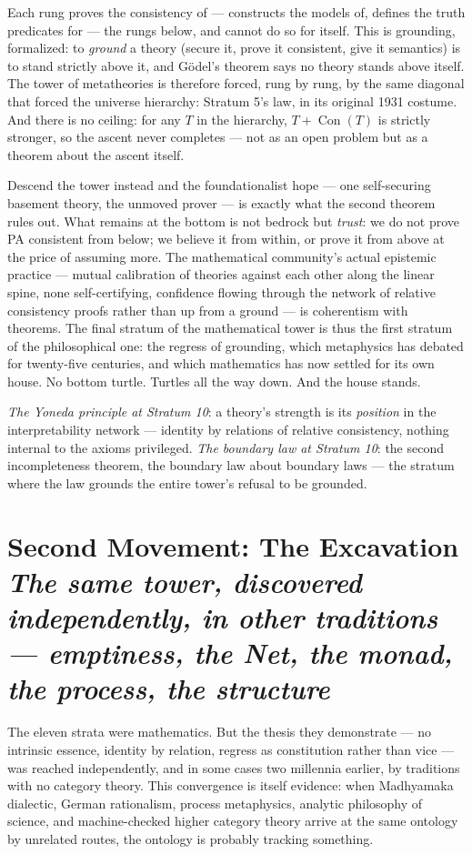 \documentclass[11pt]{article}
\theoremstyle{plain}
\theoremstyle{definition}
\theoremstyle{remark}
\newcommand{\Con}{\operatorname{Con}}
\newcommand{\stratum}[2]{\section{#1 \\ {\normalsize\normalfont\itshape #2}}}
\begin{document}
Each rung proves the consistency of --- constructs the models of, defines the truth predicates for --- the rungs below, and cannot do so for itself. This is grounding, formalized: to \emph{ground} a theory (secure it, prove it consistent, give it semantics) is to stand strictly above it, and G\"odel's theorem says no theory stands above itself. The tower of metatheories is therefore forced, rung by rung, by the same diagonal that forced the universe hierarchy: Stratum 5's law, in its original 1931 costume. And there is no ceiling: for any $T$ in the hierarchy, $T + \Con(T)$ is strictly stronger, so the ascent never completes --- not as an open problem but as a theorem about the ascent itself.

Descend the tower instead and the foundationalist hope --- one self-securing basement theory, the unmoved prover --- is exactly what the second theorem rules out. What remains at the bottom is not bedrock but \emph{trust}: we do not prove PA consistent from below; we believe it from within, or prove it from above at the price of assuming more. The mathematical community's actual epistemic practice --- mutual calibration of theories against each other along the linear spine, none self-certifying, confidence flowing through the network of relative consistency proofs rather than up from a ground --- is coherentism with theorems. The final stratum of the mathematical tower is thus the first stratum of the philosophical one: the regress of grounding, which metaphysics has debated for twenty-five centuries, and which mathematics has now settled for its own house. No bottom turtle. Turtles all the way down. And the house stands.

\begin{refrain}
\emph{The Yoneda principle at Stratum 10}: a theory's strength is its \emph{position} in the interpretability network --- identity by relations of relative consistency, nothing internal to the axioms privileged. \emph{The boundary law at Stratum 10}: the second incompleteness theorem, the boundary law about boundary laws --- the stratum where the law grounds the entire tower's refusal to be grounded.
\end{refrain}

\stratum{Second Movement: The Excavation}{The same tower, discovered independently, in other traditions --- emptiness, the Net, the monad, the process, the structure}

The eleven strata were mathematics. But the thesis they demonstrate --- no intrinsic essence, identity by relation, regress as constitution rather than vice --- was reached independently, and in some cases two millennia earlier, by traditions with no category theory. This convergence is itself evidence: when Madhyamaka dialectic, German rationalism, process metaphysics, analytic philosophy of science, and machine-checked higher category theory arrive at the same ontology by unrelated routes, the ontology is probably tracking something.
\end{document}
